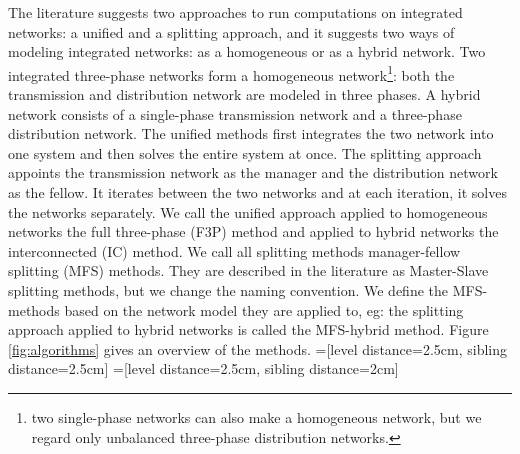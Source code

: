 \documentclass[10pt,journal]{article}
\begin{document}
The literature suggests two approaches to run computations on integrated networks: a unified and a splitting approach, and it suggests two ways of modeling integrated networks: as a homogeneous or as a hybrid network. Two integrated three-phase networks form a homogeneous network\footnote{two single-phase networks can also make a homogeneous network, but we regard only unbalanced three-phase distribution networks.}: both the transmission and distribution network are modeled in three phases. A hybrid network consists of a single-phase transmission network and a three-phase distribution network. The unified methods first integrates the two network into one system and then solves the entire system at once. The splitting approach appoints the transmission network as the manager and the distribution network as the fellow. It iterates between the two networks and at each iteration, it solves the networks separately. We call the unified approach applied to homogeneous networks the full three-phase (F3P) method and applied to hybrid networks the interconnected (IC) method. We call all splitting methods manager-fellow splitting (MFS) methods. They are described in the literature  as Master-Slave splitting methods\cite{Sun2008}, but we change the naming convention. We define the MFS-methods based on the network model they are applied to, eg: the splitting approach applied to hybrid networks is called the MFS-hybrid method. Figure \ref{fig:algorithms} gives an overview of the methods. 
=[level distance=2.5cm, sibling distance=2.5cm]
=[level distance=2.5cm, sibling distance=2cm]
\end{document}

